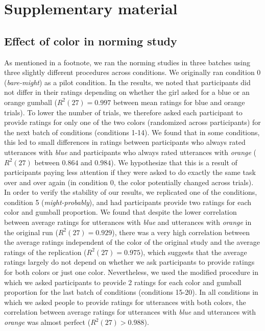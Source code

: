 \documentclass[lucida,biblatex]{sp} %
\begin{document}


\section*{Supplementary material}

\subsection*{Effect of color in norming study}

As mentioned in a footnote, we ran the norming studies in three batches using three slightly different procedures across conditions. We originally ran condition 0 (\emph{bare-might}) as a pilot condition. In the results, we noted that participants did not differ in their ratings depending on whether the girl asked for a blue or an orange gumball ($R^2(27)=0.997$ between mean ratings for blue and orange trials). To lower the number of trials, we therefore asked each participant to provide ratings for only one of the two colors (randomized across participants) for the next batch of conditions (conditions 1-14). We found that in some conditions, this led to small differences in ratings between participants who always rated utterances with \emph{blue} and participants who always rated utterances with \textit{orange} ($R^2(27)$ between $0.864$ and $0.984$). We hypothesize that this is a result of participants paying less attention if they were asked to do exactly the same task over and over again (in condition 0, the color potentially changed across trials). In order to verify the stability of our results, we replicated one of the conditions, condition 5 (\emph{might-probably}), and had participants provide two ratings for each color and gumball proportion. We found that despite the lower correlation between average ratings for utterances with \emph{blue} and utterances with \emph{orange} in the original run ($R^2(27)=0.929$), there was a very high correlation between the average ratings independent of the color of the original study and the average ratings of the replication ($R^2(27)=0.975$), which suggests that the average ratings largely do not depend on whether we ask participants to provide ratings for both colors or just one color. Nevertheless, we used the modified procedure in which we asked participants to provide 2 ratings for each color and gumball proportion for the last batch of conditions (conditions 15-20). In all conditions in which we asked people to provide ratings for utterances with both colors, the correlation between average ratings for utterances with \emph{blue} and utterances with \emph{orange} was almost perfect ($R^2(27)>0.988$).
\end{document}
